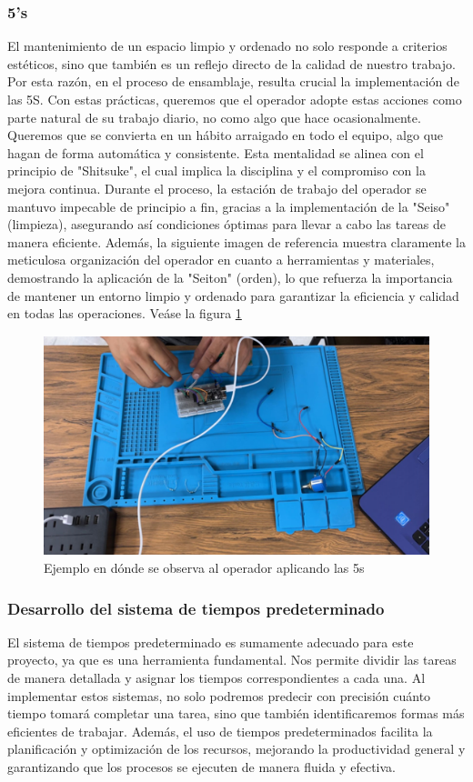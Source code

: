     \subsubsection{5's}
    El mantenimiento de un espacio limpio y ordenado no solo responde a criterios estéticos, sino que también es un reflejo directo de la calidad de nuestro trabajo. Por esta razón, en el proceso de ensamblaje, resulta crucial la implementación de las 5S. \cite{PgSantos}
    Con estas prácticas, queremos que el operador adopte estas acciones como parte natural de su trabajo diario, no como algo que hace ocasionalmente. Queremos que se convierta en un hábito arraigado en todo el equipo, algo que hagan de forma automática y consistente. Esta mentalidad se alinea con el principio de "Shitsuke", el cual implica la disciplina y el compromiso con la mejora continua. Durante el proceso, la estación de trabajo del operador se mantuvo impecable de principio a fin, gracias a la implementación de la "Seiso" (limpieza), asegurando así condiciones óptimas para llevar a cabo las tareas de manera eficiente. Además, la siguiente imagen de referencia    muestra claramente la meticulosa organización del operador en cuanto a herramientas y materiales,  demostrando la aplicación de la "Seiton" (orden), lo que refuerza la importancia de mantener un entorno limpio y ordenado para garantizar la eficiencia y calidad en todas las operaciones. Veáse la figura \ref{fig:5s}
    \begin{figure}[H]
         \centering
         \includegraphics[scale=0.4]{34/img/aplicandoLas5S.png}
         \caption{Ejemplo en dónde se observa al operador aplicando las 5s}
         \label{fig:5s}
     \end{figure}
    \subsubsection{Desarrollo del sistema de tiempos predeterminado}
    El sistema de tiempos predeterminado es sumamente adecuado para este proyecto, ya que es una herramienta fundamental. Nos permite dividir las tareas de manera detallada y asignar los tiempos correspondientes a cada una. Al implementar estos sistemas, no solo podremos predecir con precisión cuánto tiempo tomará completar una tarea, sino que también identificaremos formas más eficientes de trabajar. Además, el uso de tiempos predeterminados facilita la planificación y optimización de los recursos, mejorando la productividad general y garantizando que los procesos se ejecuten de manera fluida y efectiva.
